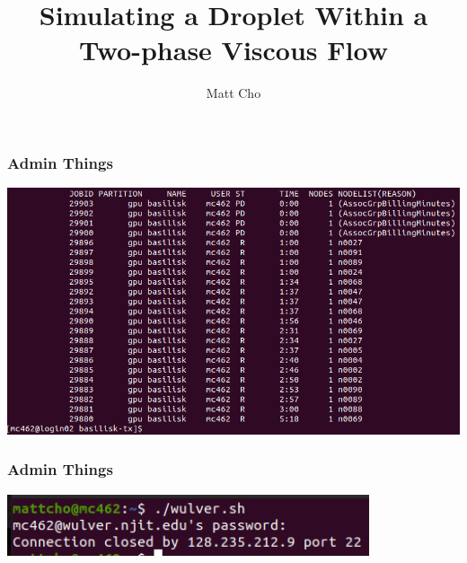 \documentclass[12pt]{beamer}
\author{Matt Cho}
\title{Simulating a Droplet Within a Two-phase Viscous Flow}
\date{}
\begin{document}
\maketitle

\begin{frame}
    \frametitle{Admin Things}
    \includegraphics[width=\textwidth]{img/8-slurm.png}
\end{frame}
\begin{frame}
    \frametitle{Admin Things}
    \includegraphics[width=0.8\textwidth]{img/9-njit.png}
\end{frame}
\end{document}
